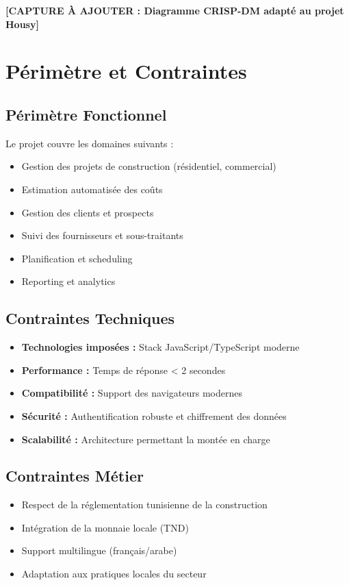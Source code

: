 \textbf{[CAPTURE À AJOUTER : Diagramme CRISP-DM adapté au projet Housy]}

\section{Périmètre et Contraintes}

\subsection{Périmètre Fonctionnel}

Le projet couvre les domaines suivants :
\begin{itemize}
    \item Gestion des projets de construction (résidentiel, commercial)
    \item Estimation automatisée des coûts
    \item Gestion des clients et prospects
    \item Suivi des fournisseurs et sous-traitants
    \item Planification et scheduling
    \item Reporting et analytics
\end{itemize}

\subsection{Contraintes Techniques}

\begin{itemize}
    \item \textbf{Technologies imposées :} Stack JavaScript/TypeScript moderne
    \item \textbf{Performance :} Temps de réponse < 2 secondes
    \item \textbf{Compatibilité :} Support des navigateurs modernes
    \item \textbf{Sécurité :} Authentification robuste et chiffrement des données
    \item \textbf{Scalabilité :} Architecture permettant la montée en charge
\end{itemize}

\subsection{Contraintes Métier}

\begin{itemize}
    \item Respect de la réglementation tunisienne de la construction
    \item Intégration de la monnaie locale (TND)
    \item Support multilingue (français/arabe)
    \item Adaptation aux pratiques locales du secteur
\end{itemize}

